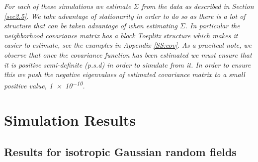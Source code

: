 \documentclass{article}
\newcommand{\nt}[1]{\textit{\color{red} #1}}
\begin{document}
\nt{For each of these simulations we estimate $\Sigma$ from the data as described in Section \ref{sec2.5}.  We take advantage of stationarity in order to do so as there is a lot of structure that can be taken advantage of when estimating $\Sigma$. In particular the neighborhood covariance matrix has a block Toeplitz structure which makes it easier to estimate, see the examples in Appendix \ref{SS:cov}.  As a pracitcal note, we observe that once the covariance function has been estimated we must ensure that it is positive semi-definite (p.s.d) in order to simulate from it. In order to ensure this we push the negative eigenvalues of estimated covariance matrix to a small positive value, \num{1e-10}.}

\section{Simulation Results}
\label{sec4}
\subsection{Results for isotropic Gaussian random fields}
\label{sec4.2}
\end{document}
